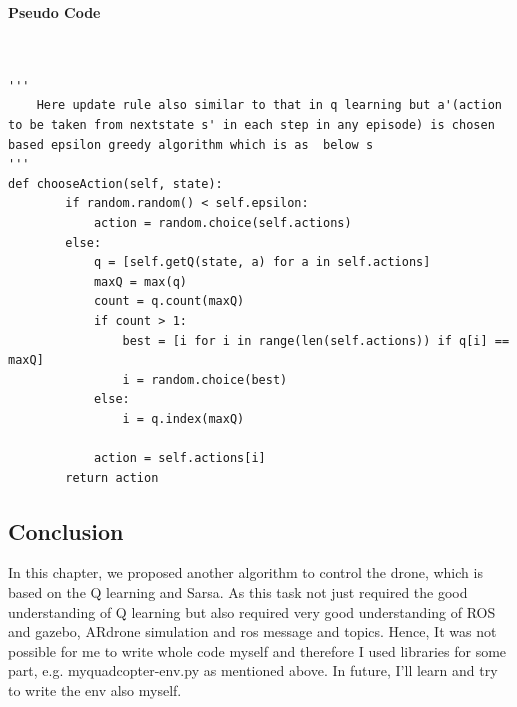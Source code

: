 \textbf{Pseudo Code}
\begin{verbatim}


'''
    Here update rule also similar to that in q learning but a'(action to be taken from nextstate s' in each step in any episode) is chosen based epsilon greedy algorithm which is as  below s
'''
def chooseAction(self, state):
        if random.random() < self.epsilon:
            action = random.choice(self.actions)
        else:
            q = [self.getQ(state, a) for a in self.actions]
            maxQ = max(q)
            count = q.count(maxQ)
            if count > 1:
                best = [i for i in range(len(self.actions)) if q[i] == maxQ]
                i = random.choice(best)
            else:
                i = q.index(maxQ)

            action = self.actions[i]
        return action

\end{verbatim}

\subsection{Conclusion}
In this chapter, we proposed another algorithm to control the drone, which is based on the Q learning and Sarsa. As this task not just required the good understanding of Q learning but also required very good understanding of ROS and gazebo, ARdrone simulation and ros message and topics.
Hence, It was not possible for me to write whole code myself and therefore I used libraries for some part, e.g. myquadcopter-env.py as mentioned above. In future, I'll learn and try to write the env also myself.

